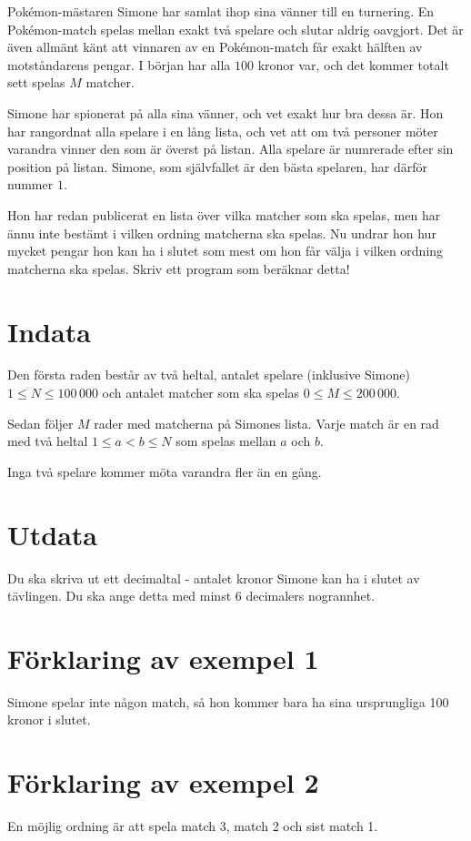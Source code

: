 Pokémon-mästaren Simone har samlat ihop sina vänner till en turnering. En
Pokémon-match spelas mellan exakt två spelare och slutar aldrig oavgjort. Det
är även allmänt känt att vinnaren av en Pokémon-match får exakt hälften av
motståndarens pengar. I början har alla $100$ kronor var, och det kommer totalt
sett spelas $M$ matcher.

Simone har spionerat på alla sina vänner, och vet exakt hur bra dessa är. Hon
har rangordnat alla spelare i en lång lista, och vet att om två personer möter
varandra vinner den som är överst på listan. Alla spelare är numrerade efter
sin position på listan. Simone, som självfallet är den bästa spelaren, har
därför nummer $1$.

Hon har redan publicerat en lista över vilka matcher som ska spelas, men har
ännu inte bestämt i vilken ordning matcherna ska spelas. Nu undrar hon hur
mycket pengar hon kan ha i slutet som mest om hon får välja i vilken ordning
matcherna ska spelas. Skriv ett program som beräknar detta!

\section*{Indata}
Den första raden består av två heltal, antalet spelare (inklusive Simone) $1
\leq N \leq 100\,000$ och antalet matcher som ska spelas $0 \leq M \le
200\,000$.

Sedan följer $M$ rader med matcherna på Simones lista. Varje match är en rad
med två heltal $1 \le a < b \le N$ som spelas mellan $a$ och $b$.

Inga två spelare kommer möta varandra fler än en gång.

\section*{Utdata}
Du ska skriva ut ett decimaltal - antalet kronor Simone kan ha i slutet av
tävlingen. Du ska ange detta med minst $6$ decimalers nogrannhet.

\section*{Förklaring av exempel 1}
Simone spelar inte någon match, så hon kommer bara ha sina ursprungliga 100
kronor i slutet.

\section*{Förklaring av exempel 2}
En möjlig ordning är att spela  match 3, match 2 och sist match 1.

